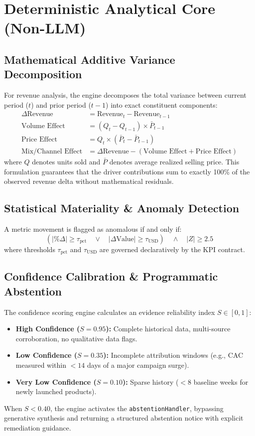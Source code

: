 \documentclass[11pt,a4paper]{article}
\begin{document}
\newpage
\section{Deterministic Analytical Core (Non-LLM)}

\subsection{Mathematical Additive Variance Decomposition}
For revenue analysis, the engine decomposes the total variance between current period ($t$) and prior period ($t-1$) into exact constituent components:
\begin{align}
\Delta\text{Revenue} &= \text{Revenue}_t - \text{Revenue}_{t-1} \\
\text{Volume Effect} &= (Q_t - Q_{t-1}) \times \bar{P}_{t-1} \\
\text{Price Effect}  &= Q_t \times (\bar{P}_t - \bar{P}_{t-1}) \\
\text{Mix/Channel Effect} &= \Delta\text{Revenue} - (\text{Volume Effect} + \text{Price Effect})
\end{align}
where $Q$ denotes units sold and $\bar{P}$ denotes average realized selling price. This formulation guarantees that the driver contributions sum to exactly 100\% of the observed revenue delta without mathematical residuals.

\subsection{Statistical Materiality \& Anomaly Detection}
A metric movement is flagged as anomalous if and only if:
\begin{equation}
\left( |\%\Delta| \ge \tau_{\text{pct}} \quad\lor\quad |\Delta\text{Value}| \ge \tau_{\text{USD}} \right) \quad\land\quad |Z| \ge 2.5
\end{equation}
where thresholds $\tau_{\text{pct}}$ and $\tau_{\text{USD}}$ are governed declaratively by the KPI contract.

\subsection{Confidence Calibration \& Programmatic Abstention}
The confidence scoring engine calculates an evidence reliability index $S \in [0, 1]$:
\begin{itemize}[noitemsep]
    \item \textbf{High Confidence ($S = 0.95$):} Complete historical data, multi-source corroboration, no qualitative data flags.
    \item \textbf{Low Confidence ($S = 0.35$):} Incomplete attribution windows (e.g., CAC measured within $< 14$ days of a major campaign surge).
    \item \textbf{Very Low Confidence ($S = 0.10$):} Sparse history ($< 8$ baseline weeks for newly launched products).
\end{itemize}
When $S < 0.40$, the engine activates the \texttt{abstentionHandler}, bypassing generative synthesis and returning a structured abstention notice with explicit remediation guidance.
\end{document}
